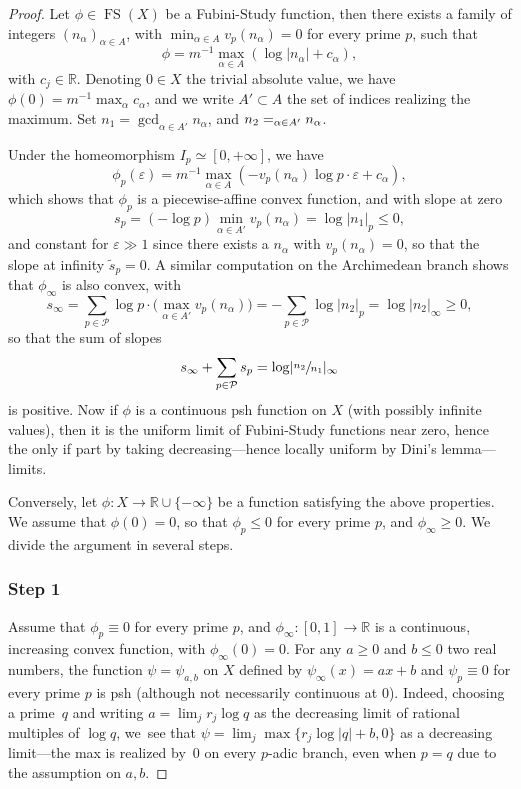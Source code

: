 \documentclass[JEP,XML,SOM,Unicode,published]{cedram}
\newcommand{\NoChangel}[1]{%
\expandafter\let\csname old\string#1\endcsname=#1
\let#1=\relax
\newcommand{#1}{\mathcode`l="716C\csname old\string#1\endcsname\mathcode`l="7160 }%
}
\theoremstyle{definition}
\newcommand \R{\mathbb R}
\let\eps\varepsilon
\DeclareMathOperator{\FS}{FS}
\DeclareMathOperator{\lcm}{lcm}\NoChangel{\lcm}
\begin{document}
\begin{proof}
Let $\phi \in \FS(X)$ be a Fubini-Study function, then there exists a family of integers $(n_{\alpha})_{\alpha \in A}$, with $\min_{\alpha \in A} v_p(n_{\alpha}) =0$ for every prime $p$, such that
\[
\phi =m^{-1} \max_{\alpha \in A} (\log \lvert n_{\alpha} \rvert + c_{\alpha}),
\]
with $c_j \in \R$. Denoting $0 \in X$ the trivial absolute value, we have $\phi(0) =m^{-1} \max_{\alpha} c_{\alpha}$, and we write $A' \subset A$ the set of indices realizing the maximum. Set $n_1 = \gcd_{\alpha \in A'} n_{\alpha}$, and $n_2 = \lcm_{\alpha \in A'} n_{\alpha}$.

Under the homeomorphism $I_p \simeq [0, + \infty]$, we have
\[
\phi_p(\eps) =m^{-1} \max_{\alpha \in A} (-v_p(n_{\alpha}) \log p \cdot \eps + c_{\alpha}),
\]
which shows that $\phi_p$ is a piecewise-affine convex function, and with slope at zero
\[
s_p = (-\log p) \min_{\alpha \in A'} v_p(n_{\alpha}) = \log \lvert n_1 \rvert_p \le 0,
\]
and constant for $\eps \gg1$ since there exists a $n_{\alpha}$ with $v_p(n_{\alpha})=0$, so that the slope at infinity $\tilde{s}_{p} =0$.
A similar computation on the Archimedean branch shows that $\phi_{\infty}$ is also convex, with
\[
s_{\infty}= \sum_{p \in \mathcal{P}} \log p \cdot \bigl(\max_{\alpha \in A'} v_p(n_{\alpha}) \bigr) = -\sum_{p \in \mathcal{P}} \log \lvert n_2 \rvert_p = \log \lvert n_2 \rvert_{\infty} \ge 0,
\]
so that the sum of slopes
\[
s_{\infty} + \sum_{p \in \mathcal{P}} s_p = \log\lvert \sfrac{n_2}{n_1}\rvert_{\infty}
\]
is positive. Now if $\phi$ is a continuous psh function on $X$ (with possibly infinite values), then it is the uniform limit of Fubini-Study functions near zero, hence the only if part by taking decreasing---hence locally uniform by Dini's lemma---limits.

Conversely, let $\phi: X \to \R \cup \{-\infty \}$ be a function satisfying the above properties. We assume that $\phi(0) = 0$, so that $\phi_p \le 0$ for every prime $p$, and $\phi_{\infty} \ge 0$. We divide the argument in several steps.

\subsubsection*{Step 1} Assume that $\phi_p \equiv 0$ for every prime $p$, and $\phi_{\infty}: [0,1] \to \R$ is a continuous, increasing convex function, with $\phi_{\infty}(0)=0$.
For any $a \ge 0$ and $b \le 0$ two real numbers, the function $\psi =\psi_{a, b}$ on $X$ defined by $\psi_{\infty}(x) = ax+b$ and $\psi_p \equiv 0$ for every prime $p$ is psh (although not necessarily continuous at $0$). Indeed, choosing a prime~$q$ and writing $a = \lim_j r_j \log q$ as the decreasing limit of rational multiples of $\log q$, we~see that $\psi = \lim_j \max \{ r_j \log \lvert q \rvert +b, 0 \}$ as a decreasing limit---the max is realized by~$0$ on every $p$-adic branch, even when $p=q$ due to the assumption on $a, b$.


\end{proof}
\end{document}
